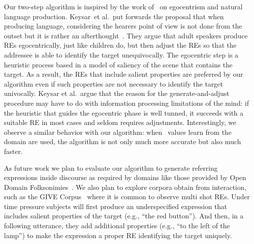Our two-step algorithm is inspired by the work of~\cite{keysar:Curr98} on egocentrism and natural language production. Keysar~et al.\ put forwards the proposal that when producing language, considering the hearers point of view is not done from the outset but it is rather an afterthought~\cite{keysar:Curr98}. They argue that adult speakers produce REs egocentrically, just like children do, but then adjust the REs so that the addressee is able to identify the target unequivocally. The egocentric step is a heuristic process based in a model of saliency of the scene that contains the target. As a result, the REs that include salient properties are preferred by our algorithm even if such properties are not necessary to identify the target univocally. Keysar et al.~argue that the reason for the generate-and-adjust procedure may have to do with information processing limitations of the mind: if the heuristic that guides the egocentric phase is well tunned, it succeeds with a suitable RE in most cases and seldom requires adjustments. Interestingly, we observe a similar behavior with our algorithm: when \puse\ values learn from the domain are used, the algorithm is not only much more accurate but also much faster. 

As future work we plan to evaluate our algorithm to generate referring expressions inside discourse as required by domains like those provided by Open Domain Folksonimies~\cite{pacheco-duboue-dominguez:2012:NAACL-HLT}. We also plan to explore corpora obtain from interaction, such as the GIVE Corpus~\cite{GarGarKolStr10} where it is common to observe multi shot REs. Under time pressure subjects will first produce an underspecified expression that includes salient properties of the target (e.g., ``the red button'').  And then, in a following utterance, they add additional properties (e.g., ``to the left of the lamp'') to make the expression a proper RE  identifying the target uniquely.

